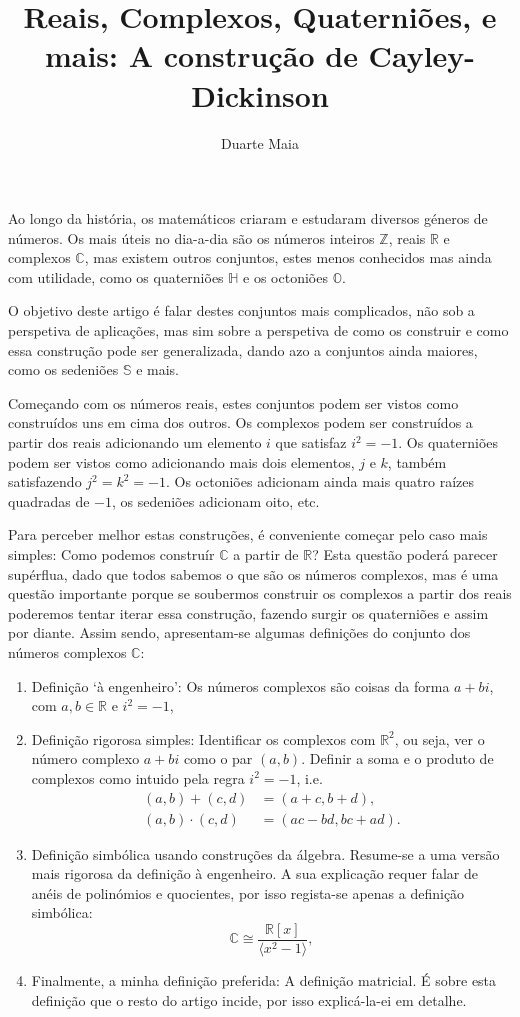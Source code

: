 \documentclass{article}
\title{Reais, Complexos, Quaterniões, e mais: A construção de Cayley-Dickinson}
\author{Duarte Maia}
\newcommand{\Z}{\mathbb{Z}}
\newcommand{\R}{\mathbb{R}}
\newcommand{\C}{\mathbb{C}}
\renewcommand{\H}{\mathbb{H}}
\renewcommand{\O}{\mathbb{O}}
\renewcommand{\S}{\mathbb{S}}
\begin{document}
\maketitle

Ao longo da história, os matemáticos criaram e estudaram diversos géneros de números. Os mais úteis no dia-a-dia são os números inteiros $\Z$, reais $\R$ e complexos $\C$, mas existem outros conjuntos, estes menos conhecidos mas ainda com utilidade, como os quaterniões $\H$ e os octoniões $\O$.

O objetivo deste artigo é falar destes conjuntos mais complicados, não sob a perspetiva de aplicações, mas sim sobre a perspetiva de como os construir e como essa construção pode ser generalizada, dando azo a conjuntos ainda maiores, como os sedeniões $\S$ e mais.

Começando com os números reais, estes conjuntos podem ser vistos como construídos uns em cima dos outros. Os complexos podem ser construídos a partir dos reais adicionando um elemento $i$ que satisfaz $i^2 = -1$. Os quaterniões podem ser vistos como adicionando mais dois elementos, $j$ e $k$, também satisfazendo $j^2 = k^2 = -1$. Os octoniões adicionam ainda mais quatro raízes quadradas de $-1$, os sedeniões adicionam oito, etc.

Para perceber melhor estas construções, é conveniente começar pelo caso mais simples: Como podemos construír $\C$ a partir de $\R$? Esta questão poderá parecer supérflua, dado que todos sabemos o que são os números complexos, mas é uma questão importante porque se soubermos construir os complexos a partir dos reais poderemos tentar iterar essa construção, fazendo surgir os quaterniões e assim por diante. Assim sendo, apresentam-se algumas definições do conjunto dos números complexos $\C$:
\begin{enumerate}[label=\roman*)]
\item Definição `à engenheiro': Os números complexos são coisas da forma $a+bi$, com $a, b \in \R$ e $i^2 = -1$,
\item Definição rigorosa simples: Identificar os complexos com $\R^2$, ou seja, ver o número complexo $a+bi$ como o par $(a,b)$. Definir a soma e o produto de complexos como intuido pela regra $i^2 = -1$, i.e.
\begin{align*}
(a,b)+(c,d) &= (a+c,b+d),\\
(a,b) \cdot (c,d) &= (ac-bd, bc+ad).
\end{align*}
\item Definição simbólica usando construções da álgebra. Resume-se a uma versão mais rigorosa da definição à engenheiro. A sua explicação requer falar de anéis de polinómios e quocientes, por isso regista-se apenas a definição simbólica:
\[\C \cong \frac{\R[x]}{\langle x^2 - 1 \rangle},\]
\item Finalmente, a minha definição preferida: A definição matricial. É sobre esta definição que o resto do artigo incide, por isso explicá-la-ei em detalhe.
\end{enumerate}
\end{document}
